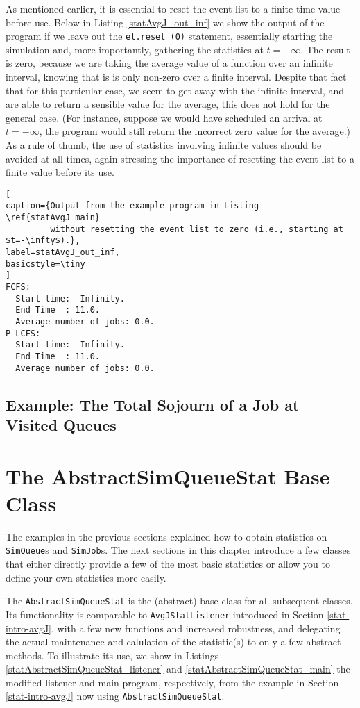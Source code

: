 \documentclass[12pt]{book}
\begin{document}
As mentioned earlier,
  it is essential to reset the event list to a finite time value before use.
Below in Listing \ref{statAvgJ_out_inf} we show the output of the program if we leave out the
  \lstinline-el.reset (0)- statement,
  essentially starting the simulation and,
  more importantly,
  gathering the statistics at $t=-\infty$.
The result is zero, because we are taking the average value
  of a function over an infinite interval,
  knowing that is is only non-zero over a finite interval.
Despite that fact that for this particular case,
  we seem to get away with the
  infinite interval, and are able to return a sensible value
  for the average,
  this does not hold for the general case.
(For instance, suppose we would have scheduled an arrival at $t=-\infty$,
  the program would still return the incorrect zero value for the average.)
As a rule of thumb, the use of statistics involving infinite values
  should be avoided at all times,
  again stressing the importance of resetting the event list to
  a finite value before its use.
  
\begin{lstlisting}[
caption={Output from the example program in Listing \ref{statAvgJ_main}
         without resetting the event list to zero (i.e., starting at $t=-\infty$).},
label=statAvgJ_out_inf,
basicstyle=\tiny
]
FCFS:
  Start time: -Infinity.
  End Time  : 11.0.
  Average number of jobs: 0.0.
P_LCFS:
  Start time: -Infinity.
  End Time  : 11.0.
  Average number of jobs: 0.0.
\end{lstlisting}

\subsection{Example: The Total Sojourn of a Job at Visited Queues}
\label{stat-intro-total-sojourn}

\section{The AbstractSimQueueStat Base Class}
\label{stat-AbstractSimQueueStat}

The examples in the previous sections explained how to
  obtain statistics on \lstinline|SimQueue|s and \lstinline|SimJob|s.
The next sections in this chapter
  introduce a few classes that either directly provide a few of the
  most basic statistics
  or allow you to define your own statistics more easily.

The \lstinline|AbstractSimQueueStat| is the (abstract) base class for all
  subsequent classes.
Its functionality is comparable to \lstinline|AvgJStatListener| introduced in
  Section \ref{stat-intro-avgJ}, with a few new functions and increased robustness,
  and delegating the actual maintenance and calulation of the statistic(s)
  to only a few abstract methods.
To illustrate its use,
  we show in
  Listings
  \ref{statAbstractSimQueueStat_listener}
  and
  \ref{statAbstractSimQueueStat_main}
  the modified listener and main program, respectively,
  from the example in Section \ref{stat-intro-avgJ}
  now using \lstinline|AbstractSimQueueStat|.
\end{document}
